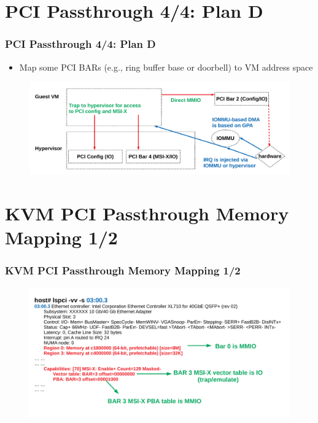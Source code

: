\documentclass[aspectratio=169]{beamer}
\begin{document}

\section{PCI Passthrough 4/4: Plan D}
\begin{frame}
\frametitle{PCI Passthrough 4/4: Plan D}
\begin{itemize}
\item Map some PCI BARs (e.g., ring buffer base or doorbell) to VM address space
\end{itemize}
\begin{figure}
\includegraphics[width=1.0\linewidth]{figures/plan_d.pdf}
\end{figure}
\end{frame}


\section{KVM PCI Passthrough Memory Mapping 1/2}
\begin{frame}
\frametitle{KVM PCI Passthrough Memory Mapping 1/2}
\begin{figure}
\includegraphics[width=1.0\linewidth]{figures/lspci.pdf}
\end{figure}
\end{frame}
\end{document}
